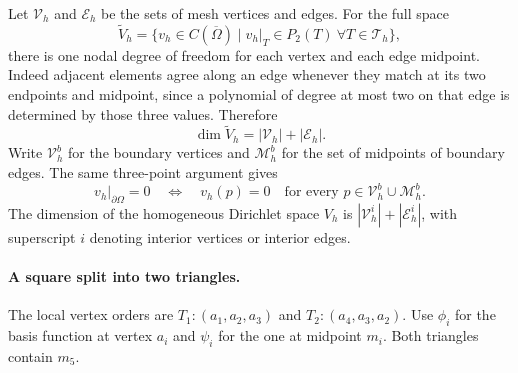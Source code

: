 \documentclass[11pt,a4paper]{article}
\begin{document}
Let \(\mathcal V_h\) and \(\mathcal E_h\) be the sets of mesh vertices and edges. For the full space
\[
 \widetilde V_h=\{v_h\in C(\overline\Omega)\mid
                  v_h|_T\in P_2(T)\ \forall T\in\mathcal T_h\},
\]
there is one nodal degree of freedom for each vertex and each edge midpoint. Indeed adjacent elements agree along an edge whenever they match at its two endpoints and midpoint, since a polynomial of degree at most two on that edge is determined by those three values. Therefore
\[
 \dim\widetilde V_h=|\mathcal V_h|+|\mathcal E_h|.
\]
Write \(\mathcal V_h^b\) for the boundary vertices and \(\mathcal M_h^b\) for the set of midpoints of boundary edges. The same three-point argument gives
\[
 v_h|_{\partial\Omega}=0
 \quad\Longleftrightarrow\quad
 v_h(p)=0\quad\text{for every }p\in\mathcal V_h^b\cup\mathcal M_h^b.
\]
The dimension of the homogeneous Dirichlet space \(V_h\) is \(|\mathcal V_h^i|+|\mathcal E_h^i|\), with superscript \(i\) denoting interior vertices or interior edges.

\paragraph{A square split into two triangles.}
The local vertex orders are \(T_1:(a_1,a_2,a_3)\) and \(T_2:(a_4,a_3,a_2)\). Use \(\phi_i\) for the basis function at vertex \(a_i\) and \(\psi_i\) for the one at midpoint \(m_i\). Both triangles contain \(m_5\).

\begin{center}
\end{center}
\end{document}
